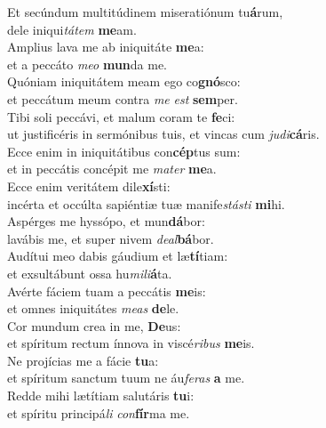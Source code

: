\evenverse Et secúndum multitúdinem miseratiónum tu\textbf{á}rum,~\*\\
\evenverse dele iniqui\textit{tá}\textit{tem} \textbf{me}am.\\
\oddverse Amplius lava me ab iniquitáte \textbf{me}a:~\*\\
\oddverse et a peccáto \textit{me}\textit{o} \textbf{mun}da me.\\
\evenverse Quóniam iniquitátem meam ego co\textbf{gnó}sco:~\*\\
\evenverse et peccátum meum contra \textit{me} \textit{est} \textbf{sem}per.\\
\oddverse Tibi soli peccávi, et malum coram te \textbf{fe}ci:~\*\\
\oddverse ut justificéris in sermónibus tuis, et vincas cum \textit{ju}\textit{di}\textbf{cá}ris.\\
\evenverse Ecce enim in iniquitátibus con\textbf{cép}tus sum:~\*\\
\evenverse et in peccátis concépit me \textit{ma}\textit{ter} \textbf{me}a.\\
\oddverse Ecce enim veritátem dile\textbf{xí}sti:~\*\\
\oddverse incérta et occúlta sapiéntiæ tuæ manife\textit{stá}\textit{sti} \textbf{mi}hi.\\
\evenverse Aspérges me hyssópo, et mun\textbf{dá}bor:~\*\\
\evenverse lavábis me, et super nivem \textit{de}\textit{al}\textbf{bá}bor.\\
\oddverse Audítui meo dabis gáudium et læ\textbf{tí}tiam:~\*\\
\oddverse et exsultábunt ossa hu\textit{mi}\textit{li}\textbf{á}ta.\\
\evenverse Avérte fáciem tuam a peccátis \textbf{me}is:~\*\\
\evenverse et omnes iniquitátes \textit{me}\textit{as} \textbf{de}le.\\
\oddverse Cor mundum crea in me, \textbf{De}us:~\*\\
\oddverse et spíritum rectum ínnova in viscé\textit{ri}\textit{bus} \textbf{me}is.\\
\evenverse Ne projícias me a fácie \textbf{tu}a:~\*\\
\evenverse et spíritum sanctum tuum ne áu\textit{fe}\textit{ras} \textbf{a} me.\\
\oddverse Redde mihi lætítiam salutáris \textbf{tu}i:~\*\\
\oddverse et spíritu principá\textit{li} \textit{con}\textbf{fír}ma me.\\
